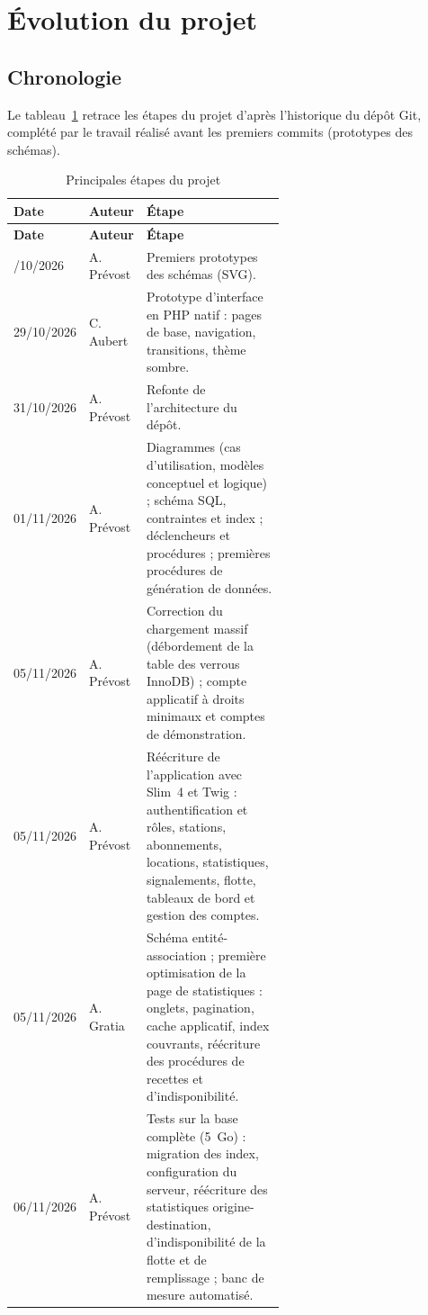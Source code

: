 \section{Évolution du projet}\label{sec:evolution}

\subsection{Chronologie}

Le tableau~\ref{tab:chronologie} retrace les étapes du projet d'après l'historique du dépôt Git, complété par le travail réalisé avant les premiers commits (prototypes des schémas).

{\small
\begin{longtable}{l l >{\raggedright\arraybackslash}p{0.6\linewidth}}
	\caption{Principales étapes du projet}\label{tab:chronologie}\\
	\toprule
	\textbf{Date} & \textbf{Auteur} & \textbf{Étape} \\
	\midrule\endfirsthead
	\toprule
	\textbf{Date} & \textbf{Auteur} & \textbf{Étape} \\
	\midrule\endhead
	\bottomrule\endlastfoot
	29/10/2026 & A. Prévost & Premiers prototypes des schémas (SVG). \\
	29/10/2026 & C. Aubert & Prototype d'interface en PHP natif : pages de base, navigation, transitions, thème sombre. \\
	31/10/2026 & A. Prévost & Refonte de l'architecture du dépôt. \\
	01/11/2026 & A. Prévost & Diagrammes (cas d'utilisation, modèles conceptuel et logique) ; schéma SQL, contraintes et index ; déclencheurs et procédures ; premières procédures de génération de données. \\
	05/11/2026 & A. Prévost & Correction du chargement massif (débordement de la table des verrous InnoDB) ; compte applicatif à droits minimaux et comptes de démonstration. \\
	05/11/2026 & A. Prévost & Réécriture de l'application avec Slim~4 et Twig : authentification et rôles, stations, abonnements, locations, statistiques, signalements, flotte, tableaux de bord et gestion des comptes. \\
	05/11/2026 & A. Gratia & Schéma entité-association ; première optimisation de la page de statistiques : onglets, pagination, cache applicatif, index couvrants, réécriture des procédures de recettes et d'indisponibilité. \\
	06/11/2026 & A. Prévost & Tests sur la base complète (5~Go) : migration des index, configuration du serveur, réécriture des statistiques origine-destination, d'indisponibilité de la flotte et de remplissage ; banc de mesure automatisé. \\

\end{longtable}}
